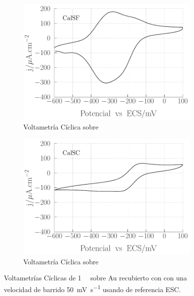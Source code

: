 						\begin{figure}[th]
				 	   	    \begin{subfigure}[t]{0.495\textwidth}
				        	\includegraphics[width=\textwidth]{Graficos/SF-accesibilidad.pdf}
				       		\caption{Voltametría Cíclica sobre \pdmF}
				         	\end{subfigure}
				         	\begin{subfigure}[t]{0.495\textwidth}
				        	\includegraphics[width=\textwidth]{Graficos/SC-accesibilidad.pdf}
				       		\caption{Voltametría Cíclica sobre \pdmC}
				         	\end{subfigure}
				     		\caption[Accesibilidad electrodo de trabajo.]{Voltametrías Cíclicas de \aminorutenio\space \SI{1}{\milli\Molar} sobre Au recubierto con \pdm\space con una velocidad de barrido \SI{50}{\milli\volt\per\second} usando de referencia ESC.}
				     		\label{fig:accesibilidad}
				     		\end{figure}
	
